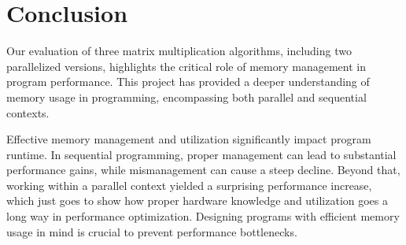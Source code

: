 \section{Conclusion}
Our evaluation of three matrix multiplication algorithms, including two parallelized versions, highlights the critical role of memory management in program performance. This project has provided a deeper understanding of memory usage in programming, encompassing both parallel and sequential contexts.

Effective memory management and utilization significantly impact program runtime. In sequential programming, proper management can lead to substantial performance gains, while mismanagement can cause a steep decline. 
Beyond that, working within a parallel context yielded a surprising performance increase, which just goes to show how proper hardware knowledge and utilization goes a long way in performance optimization.
Designing programs with efficient memory usage in mind is crucial to prevent performance bottlenecks.
